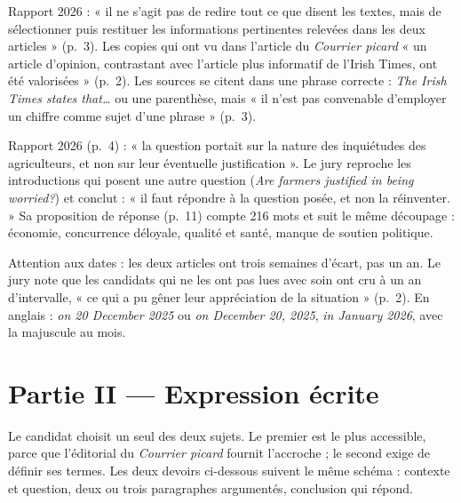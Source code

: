 \documentclass[11pt,a4paper]{article}
\begin{document}
\begin{jury}

Rapport 2026 : « il ne s'agit pas de redire tout ce que disent les textes, mais de sélectionner puis restituer les informations pertinentes relevées dans les deux articles » (p.~3). Les copies qui ont vu dans l'article du \emph{Courrier picard} « un article d'opinion, contrastant avec l'article plus informatif de l'Irish Times, ont été valorisées » (p.~2). Les sources se citent dans une phrase correcte : \emph{The Irish Times states that\ldots{}} ou une parenthèse, mais « il n'est pas convenable d'employer un chiffre comme sujet d'une phrase » (p.~3).

\end{jury}

\begin{jury}

Rapport 2026 (p.~4) : « la question portait sur la nature des inquiétudes des agriculteurs, et non sur leur éventuelle justification ». Le jury reproche les introductions qui posent une autre question (\emph{Are farmers justified in being worried?}) et conclut : « il faut répondre à la question posée, et non la réinventer. » Sa proposition de réponse (p.~11) compte 216 mots et suit le même découpage : économie, concurrence déloyale, qualité et santé, manque de soutien politique.

\end{jury}

\begin{piege}

Attention aux dates : les deux articles ont trois semaines d'écart, pas un an. Le jury note que les candidats qui ne les ont pas lues avec soin ont cru à un an d'intervalle, « ce qui a pu gêner leur appréciation de la situation » (p.~2). En anglais : \emph{on 20 December 2025} ou \emph{on December 20, 2025}, \emph{in January 2026}, avec la majuscule au mois.

\end{piege}

\hypertarget{partie-ii-expression-uxe9crite}{%
\section{Partie II --- Expression écrite}\label{partie-ii-expression-uxe9crite}}

Le candidat choisit un seul des deux sujets. Le premier est le plus accessible, parce que l'éditorial du \emph{Courrier picard} fournit l'accroche ; le second exige de définir ses termes. Les deux devoirs ci-dessous suivent le même schéma : contexte et question, deux ou trois paragraphes argumentés, conclusion qui répond.
\end{document}
